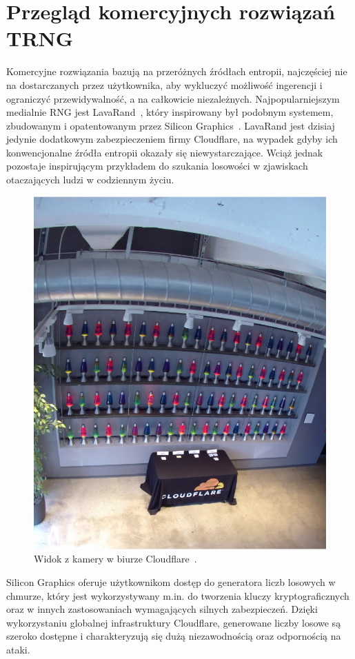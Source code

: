 \section{Przegląd komercyjnych rozwiązań TRNG}\label{sec:przeglad-komercyjnych-rozwiazan-trng}

Komercyjne rozwiązania bazują na przeróżnych źródłach entropii,
najczęściej nie na dostarczanych przez użytkownika, aby wykluczyć możliwość ingerencji i ograniczyć przewidywalność, a na całkowicie niezależnych.
Najpopularniejszym medialnie RNG jest LavaRand~\cite{cloudflare_lavarand}, który inspirowany był podobnym systemem,
zbudowanym i opatentowanym przez Silicon Graphics~\cite{SiliconGraphics}.
LavaRand jest dzisiaj jedynie dodatkowym zabezpieczeniem firmy Cloudflare,
na wypadek gdyby ich konwencjonalne źródła entropii okazały się niewystarczające.
Wciąż jednak pozostaje inspirującym przykładem do szukania losowości w zjawiskach otaczających ludzi w codziennym życiu.

\begin{figure}[h]
    \centering
    \includegraphics[width=0.4\linewidth]{chapters/02-teoria/figures/lavarandCamera}
    \caption{Widok z kamery w biurze Cloudflare~\cite{cloudflare_lavarand}.}
    \label{fig:lavarand}
\end{figure}

Silicon Graphics oferuje użytkownikom dostęp do generatora liczb losowych w chmurze, który jest wykorzystywany
m.in. do tworzenia kluczy kryptograficznych oraz w innych zastosowaniach wymagających silnych zabezpieczeń.
Dzięki wykorzystaniu globalnej infrastruktury Cloudflare, generowane liczby losowe są
szeroko dostępne i charakteryzują się dużą niezawodnością oraz odpornością na ataki.

